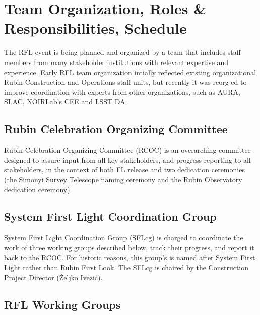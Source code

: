 \section{Team Organization, Roles \& Responsibilities, Schedule}

The RFL event is being planned and organized by a team that includes staff members
from many stakeholder institutions with relevant expertise and experience. Early
RFL team organization intially reflected existing organizational Rubin Construction
and Operations staff units, but recently it was reorg-ed to improve coordination
with experts from other organizations, such as AURA, SLAC, NOIRLab's CEE and LSST DA. 


\subsection{Rubin Celebration Organizing Committee}

Rubin Celebration Organizing Committee (RCOC) is
an overarching committee designed to assure input from all key stakeholders, and progress reporting to all stakeholders, in the context of both FL release and two dedication ceremonies (the Simonyi Survey Telescope naming ceremony and the Rubin Observatory dedication ceremony)


\subsection{System First Light Coordination Group}

System First Light Coordination Group (SFLcg) is charged to coordinate the work of three working groups
described below, track their progress, and report it back to the RCOC. For historic reasons, this group's
is named after System First Light rather than Rubin First Look. The SFLcg is chaired by the Construction
Project Director (\v{Z}eljko Ivezi\'{c}). 


\subsection{RFL Working Groups \label{WGs}}

